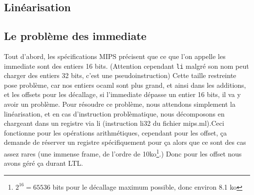 \documentclass[a4paper]{article}
\begin{document}
\subsection{Linéarisation}

\subsection{Le problème des immediate}
Tout d'abord, les spécifications MIPS précisent que ce que l'on appelle
les
 immediate sont des entiers 16 bits. (Attention cependant \texttt{li} malgré son
nom peut charger des entiers 32 bits, c'est une pseudoinstruction) Cette
taille restreinte pose problème, car nos entiers ocaml sont plus grand,
et ainsi dans les additions, et les offsets pour les décallage, si
l'immediate dépasse un entier 16 bits, il va y avoir un problème. Pour
résoudre ce problème, nous attendons simplement la linéarisation, et en
cas d'instruction problèmatique, nous décomposons en chargeant dans un
registre via li (instruction li32 du fichier mips.ml).Ceci fonctionne
pour les opérations arithmétiques, cependant pour les offset, ça demande
de réserver un registre spécifiquement pour ça
alors que ce sont des cas assez rares (une immense frame, de l'ordre de
10ko\footnote{$2^16=65536$ bits pour le décallage maximum possible, donc environ 8.1 ko}.) 
Donc pour les offset nous avons géré ça durant LTL.
\end{document}
